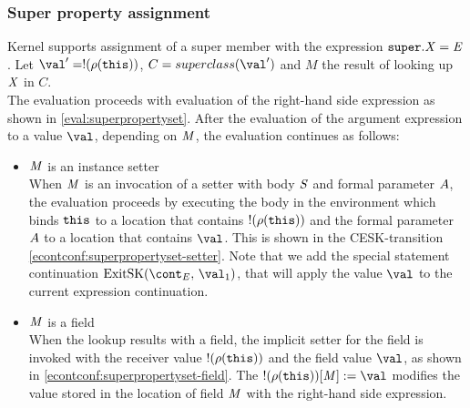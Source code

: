 \documentclass{article}
\begin{document}
\subsubsection{Super property assignment}
\label{subsubsec:super-property-assignemnt}
Kernel supports assignment of a super member with the expression $\tt{super}.\mathit{X}=\mathit{E}$.
Let $\val' = \deref{(\env(\this))}$, $C = \superclass{\val'}$ and $M$ the result of looking up $\mathit{X}$ in $C$.\\
The evaluation proceeds with evaluation of the right-hand side expression as shown in \eqref{eval:superpropertyset}.
After the evaluation of the argument expression to a value $\val$, depending on $\mathit{M}$, the evaluation continues as follows:
\begin{itemize}
\item $\mathit{M}$ is an instance setter\\
When $\mathit{M}$ is an invocation of a setter with body $\mathit{S}$ and formal parameter $A$, the evaluation proceeds by executing the body in the environment which binds $\tt{this}$ to a location that contains $!(\rho(\tt{this}))$ and the formal parameter $A$ to a location that contains $\val$.
This is shown in the CESK-transition \eqref{econtconf:superpropertyset-setter}.
Note that we add the special statement continuation $\ExitSK{\val_1}$, that will apply the value $\val$ to the current expression continuation.
\item $\mathit{M}$ is a field\\
When the lookup results with a field, the implicit setter for the field is invoked with the receiver value $!(\rho(\tt{this}))$ and the field value $\val$, as shown in \eqref{econtconf:superpropertyset-field}.
The $\update{\deref{(\env(\this))}[\membermeta]}{\val}$ modifies the value stored in the location of field $\mathit{M}$ with the right-hand side expression.
\end{itemize}
%
%
%
\end{document}
